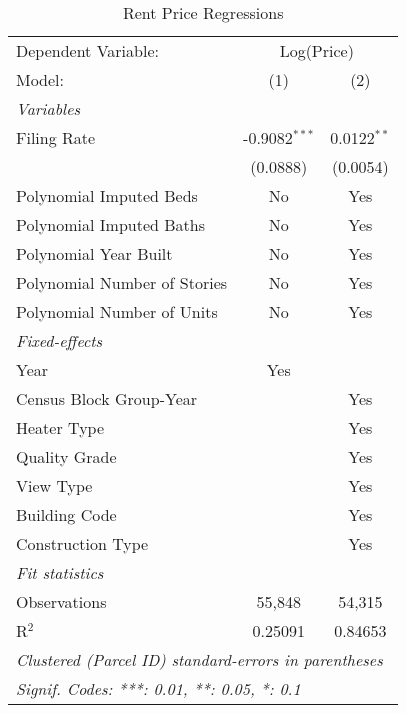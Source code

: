 \begin{table}[htbp]
   \caption{\label{tab:rent_regs} Rent Price Regressions}
   \centering
   \begin{tabular}{lcc}
      \tabularnewline \midrule \midrule
      Dependent Variable: & \multicolumn{2}{c}{Log(Price)}\\
      Model:                       & (1)             & (2)\\  
      \midrule
      \emph{Variables}\\
      Filing Rate                  & -0.9082$^{***}$ & 0.0122$^{**}$\\   
                                   & (0.0888)        & (0.0054)\\   
      Polynomial Imputed Beds      & No              & Yes\\  
      Polynomial Imputed Baths     & No              & Yes\\  
      Polynomial Year Built        & No              & Yes\\  
      Polynomial Number of Stories & No              & Yes\\  
      Polynomial Number of Units   & No              & Yes\\  
      \midrule
      \emph{Fixed-effects}\\
      Year                         & Yes             & \\  
      Census Block Group-Year      &                 & Yes\\  
      Heater Type                  &                 & Yes\\  
      Quality Grade                &                 & Yes\\  
      View Type                    &                 & Yes\\  
      Building Code                &                 & Yes\\  
      Construction Type            &                 & Yes\\  
      \midrule
      \emph{Fit statistics}\\
      Observations                 & 55,848          & 54,315\\  
      R$^2$                        & 0.25091         & 0.84653\\  
      \midrule \midrule
      \multicolumn{3}{l}{\emph{Clustered (Parcel ID) standard-errors in parentheses}}\\
      \multicolumn{3}{l}{\emph{Signif. Codes: ***: 0.01, **: 0.05, *: 0.1}}\\
   \end{tabular}
\end{table}
